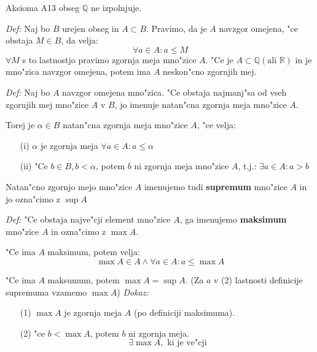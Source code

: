 Aksioma A13 obseg $\mathbb{Q}$ ne izpolnjuje.

\emph{Def:} Naj bo $B$ urejen obseg in $A \subset B$. Pravimo, da je $A$ navzgor omejena, "ce obstaja $M \in B$, da velja:
\[\forall a \in A: a \leq M\]
$\forall M$ s to lastnostjo pravimo zgornja meja mno"zice $A$. "Ce je $A \subset \mathbb{Q} (\text{ali } \mathbb{R})$ in je mno"zica navzgor omejena, potem ima $A$ neskon"cno zgornjih mej.

\emph{Def:} Naj bo $A$ navzgor omejena mno"zica. "Ce obstaja najmanj"sa od vseh zgornjih mej mno"zice $A$ v $B$, jo imenuje natan"cna zgornja meja mno"zice $A$.

Torej je $\alpha \in B$ natan"cna zgornja meja mno"zice $A$, "ce velja:
\begin{itemize}
	\item[(i)] $\alpha$ je zgornja meja $\forall a \in A: a \leq \alpha$
	\item[(ii)] "Ce $b \in B, b < \alpha$, potem $b$ ni zgornja meja mno"zice $A$, t.j.: $\exists a \in A: a > b$
\end{itemize}
Natan"cno zgornjo mejo mno"zice $A$ imenujemo tudi \textbf{supremum} mno"zice $A$ in jo ozna"cimo z $\sup A$

\emph{Def:} "Ce obstaja najve"cji element mno"zice $A$, ga imenujemo \textbf{maksimum} mno"zice $A$ in ozna"cimo z $\max A$.

"Ce ima $A$ maksimum, potem velja:
\[\max A \in A \land \forall a \in A: a \leq \max A\]

"Ce ima $A$ maksumum, potem $\max A = \sup A$. (Za $a$ v (2) lastnosti definicije supremuma vzamemo $\max A$)
\emph{Dokaz:}
\begin{itemize}
	\item[(1)] $\max A$ je zgornja meja $A$ (po definiciji maksimuma).
	\item[(2)] "ce $b < \max A$, potem $b$ ni zgornja meja.
	\[\exists \max A, \text{ ki je ve"cji}\]
\end{itemize}

